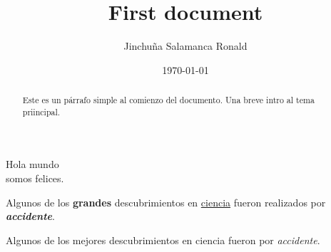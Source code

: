 \documentclass[12pt, letterpaper]{article}
\title{First document}
\author{Jinchuña Salamanca Ronald}
\date{\today}
\begin{document}
\begin{titlepage}
\maketitle
\end{titlepage}

\begin{abstract}
Este es un párrafo simple al comienzo del documento. Una breve intro al tema priincipal.
\end{abstract}

Hola mundo \\ somos felices.

Algunos de los \textbf{grandes}
descubrimientos en \underline{ciencia}
fueron realizados por \textbf{\textit{accidente}}.

Algunos de los mejores descubrimientos en ciencia fueron por \emph{accidente}.
\end{document}
